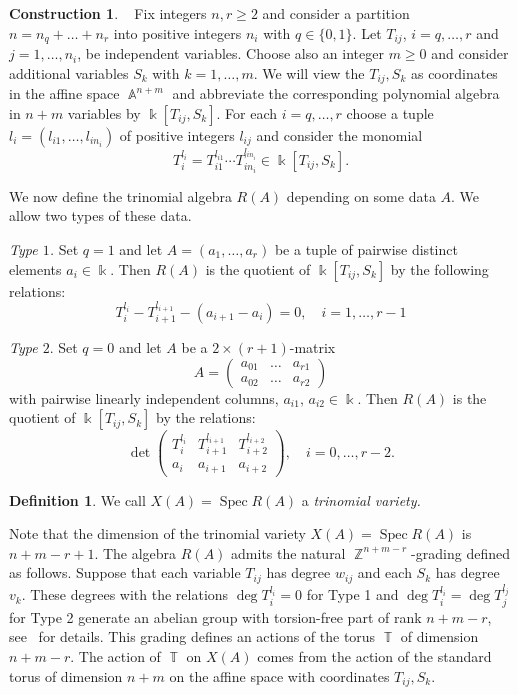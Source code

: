 \documentclass[a4paper,reqno,12pt]{amsart}
\theoremstyle{theorem}
\theoremstyle{definition}
\newtheorem{definition}[theorem]{Definition}
\newtheorem{construction}[theorem]{Construction}
\theoremstyle{theorem}
\theoremstyle{remark}
\DeclareMathOperator{\Spec}{Spec}
\DeclareMathOperator{\A}{\mathbb A}
\DeclareMathOperator{\TT}{\mathbb T}
\DeclareMathOperator{\ZZ}{\mathbb Z}
\newcommand{\kk}{\Bbbk}
\newcommand{\0}{\circ}
\begin{document}
\begin{construction}~\cite[Construction~1.1]{HW}
 Fix integers $n,r\ge2$ and consider a partition $n=n_{q}+\ldots+n_r$ into positive integers $n_i$ with $q\in\{0,1\}$. Let $T_{ij}$, $i=q,\ldots,r$ and $j=1,\ldots,n_i$, be independent variables. Choose also an integer $m\ge0$ and consider additional variables $S_k$ with $k=1,\ldots, m$. We will view the $T_{ij}, S_k$ as coordinates in the affine space $\A^{n+m}$ and abbreviate the corresponding polynomial algebra in $n+m$ variables by $\kk[T_{ij}, S_k]$. For each $i=q,\ldots, r$ choose a tuple $l_i=(l_{i1},\ldots, l_{in_i})$ of positive integers $l_{ij}$ and consider the monomial
 $$
 T_{i}^{l_i} = T_{i1}^{l_{i1}}\cdots T_{in_i}^{l_{in_i}}\in \kk[T_{ij}, S_k].
 $$ 

We now define the trinomial algebra $R(A)$ depending on some data $A$. We allow two types of these data.

\textit{Type $1$.} Set $q=1$ and let $A=(a_1,\ldots, a_r)$ be a tuple of pairwise distinct elements $a_i\in\kk$. Then $R(A)$ is the quotient of $\kk[T_{ij}, S_k]$ by the following relations:
\begin{equation}\label{equations1}
    T_i^{l_i}-T_{i+1}^{l_{i+1}} - (a_{i+1}-a_i)=0,\quad i=1,\ldots, r-1
\tag{1.1}
\end{equation}

\textit{Type $2$}. Set $q=0$ and let $A$ be a $2\times(r+1)$-matrix 
$$
A = \begin{pmatrix}
    a_{01} &\ldots &a_{r1}\\
    a_{02} &\ldots &a_{r2}
\end{pmatrix}
$$ with pairwise linearly independent columns, $a_{i1},\,a_{i2}\in\kk$. Then $R(A)$ is the quotient of $\kk[T_{ij}, S_k]$ by the relations:
\begin{equation}\label{equations2}
    \det \begin{pmatrix}
    T_i^{l_i} & T_{i+1}^{l_{i+1}} & T_{i+2}^{l_{i+2}}\\
    a_i & a_{i+1} & a_{i+2}
\end{pmatrix}, \quad i=0,\ldots,r-2.
\tag{1.2}
\end{equation}
\end{construction}
\begin{definition}
    We call $X(A)=\Spec R(A)$ a \emph{trinomial variety.}
\end{definition}

Note that the dimension of the trinomial variety $X(A)=\Spec R(A)$ is $n+m-r+1$. The algebra $R(A)$ admits the natural $\ZZ^{n+m-r}$-grading defined as follows. Suppose that each variable $T_{ij}$ has degree $w_{ij}$ and each $S_k$ has degree $v_k$. These degrees with the relations $\deg T_i^{l_i}=0$ for Type 1 and $\deg T_i^{l_i}=\deg T_j^{l_j}$ for Type 2 generate an abelian group with torsion-free part of rank $n+m-r$, see~\cite{HW} for details. This grading defines an actions of the torus $\TT$ of dimension $n+m-r$. The action of $\TT$ on $X(A)$ comes from the action of the standard torus of dimension $n+m$ on the affine space with coordinates $T_{ij}, S_k$.
\end{document}
